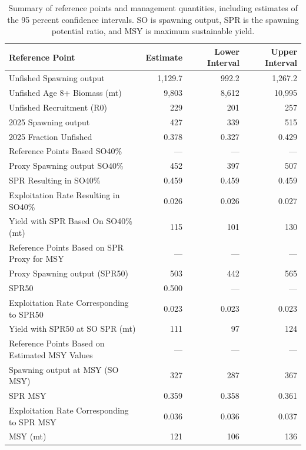 \documentclass[
]{scrartcl}
\begin{document}
\begin{longtable}{lrrr}

\caption{\label{tbl-ref-points-es-2}Summary of reference points and
management quantities, including estimates of the 95 percent confidence
intervals. SO is spawning output, SPR is the spawning potential ratio,
and MSY is maximum sustainable yield.}

\tabularnewline

\toprule
Reference Point & Estimate & Lower Interval & Upper Interval \\ 
\midrule\addlinespace[2.5pt]
Unfished Spawning output & 1,129.7 & 992.2 & 1,267.2 \\ 
Unfished Age 8+ Biomass (mt) & 9,803 & 8,612 & 10,995 \\ 
Unfished Recruitment (R0) & 229 & 201 & 257 \\ 
2025 Spawning output & 427 & 339 & 515 \\ 
2025 Fraction Unfished & 0.378 & 0.327 & 0.429 \\ 
Reference Points Based SO40\% & — & — & — \\ 
Proxy Spawning output SO40\% & 452 & 397 & 507 \\ 
SPR Resulting in SO40\% & 0.459 & 0.459 & 0.459 \\ 
Exploitation Rate Resulting in SO40\% & 0.026 & 0.026 & 0.027 \\ 
Yield with SPR Based On SO40\% (mt) & 115 & 101 & 130 \\ 
Reference Points Based on SPR Proxy for MSY & — & — & — \\ 
Proxy Spawning output (SPR50) & 503 & 442 & 565 \\ 
SPR50 & 0.500 & — & — \\ 
Exploitation Rate Corresponding to SPR50 & 0.023 & 0.023 & 0.023 \\ 
Yield with SPR50 at SO SPR (mt) & 111 & 97 & 124 \\ 
Reference Points Based on Estimated MSY Values & — & — & — \\ 
Spawning output at MSY (SO MSY) & 327 & 287 & 367 \\ 
SPR MSY & 0.359 & 0.358 & 0.361 \\ 
Exploitation Rate Corresponding to SPR MSY & 0.036 & 0.036 & 0.037 \\ 
MSY (mt) & 121 & 106 & 136 \\ 
\bottomrule

\end{longtable}

\endgroup
\end{document}
